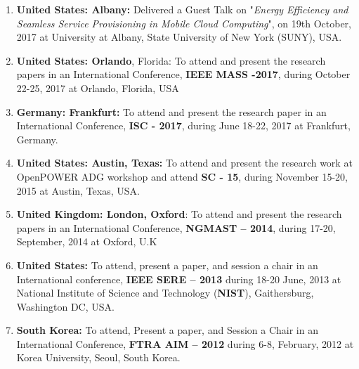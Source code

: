 \begin{enumerate}


\item
\textbf{United States: Albany:} Delivered a Guest Talk on "\textit{Energy Efficiency and Seamless Service Provisioning in Mobile Cloud Computing}", on 19th October, 2017 at University at Albany, State University of New York (SUNY), USA. 

\item
\textbf{United States: Orlando}, Florida: To attend and present the research papers in an International Conference, \textbf{IEEE MASS -2017}, during October 22-25, 2017 at Orlando, Florida, USA

\item
\textbf{Germany: Frankfurt:} To attend and present the research paper in an International Conference, \textbf{ISC - 2017}, during June 18-22, 2017 at Frankfurt, Germany.

\item
\textbf{United States: Austin, Texas:} To attend and present the research work at OpenPOWER ADG workshop and attend \textbf{SC - 15}, during November 15-20, 2015 at Austin, Texas, USA.

\item
\textbf{United Kingdom: London, Oxford}: To attend and present the research papers in an International Conference, \textbf{NGMAST – 2014}, during 17-20, September, 2014 at Oxford, U.K

\item
\textbf{United States:} To attend, present a paper, and session a chair in an International conference, \textbf{IEEE SERE – 2013} during 18-20 June, 2013 at National Institute of Science and Technology (\textbf{NIST}), Gaithersburg, Washington DC, USA.

\item
\textbf{South Korea:} To attend, Present a paper, and Session a Chair in an International Conference, \textbf{FTRA AIM – 2012} during 6-8, February, 2012 at Korea University, Seoul, South Korea.
	

\end{enumerate}